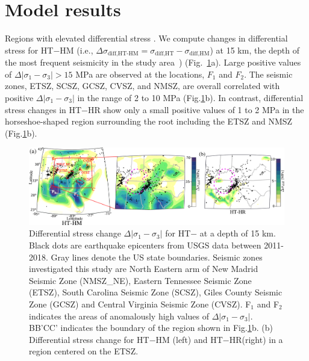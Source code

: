 \documentclass[draft,linenumbers]{agujournal2018}
\begin{document}
\section{Model results}
%
Regions with elevated differential stress . We compute changes in differential stress for HT$-$HM (i.e., $\Delta \sigma_{\text{diff,HT-HM}} = \sigma_{\text{diff,HT}}-\sigma_{\text{diff,HM}}$)
at 15 km, the depth of the most frequent seismicity in the study area~\citep[e.g.,][]{mazzotti2010state}) (Fig.~\ref{df_model}a). Large positive values of $\Delta |\sigma_1 - \sigma_3|>15$ MPa are observed at the locations, $F_1$ and $F_2$. The seismic zones, ETSZ, SCSZ, GCSZ, CVSZ, and NMSZ, are overall correlated with positive $\Delta |\sigma_1 - \sigma_3|$ in the range of 2 to 10 MPa (Fig.\ref{df_model}b). In contrast, differential stress changes in HT$-$HR show only a small positive values of 1 to 2 MPa in the horseshoe-shaped region surrounding the root including the ETSZ and NMSZ (Fig.\ref{df_model}b).
%
\begin{figure}[h!]
    \centering
    \includegraphics[width=0.75\linewidth]{figures/diff_stress_model.png}
    \caption{ Differential stress change $\Delta|\sigma_1-\sigma_3|$ for HT$-$ at a depth of 15 km. Black dots are earthquake epicenters from USGS data between 2011-2018. Gray lines denote the US state boundaries. Seismic zones investigated this study are North Eastern arm of New Madrid Seismic Zone (NMSZ\_NE), Eastern Tennessee Seismic Zone (ETSZ), South Carolina Seismic Zone (SCSZ), Giles County Seismic Zone (GCSZ) and Central Virginia Seismic Zone (CVSZ). F$_1$ and F$_2$ indicates the areas of anomalously high values of $\Delta|\sigma_1 - \sigma_3|$. BB'CC' indicates the boundary of the region shown in Fig.\ref{df_model}b. (b) Differential stress change for HT$-$HM (left) and HT$-$HR(right) in a region centered on the ETSZ.}
    \label{df_model}
\end{figure}
\end{document}
